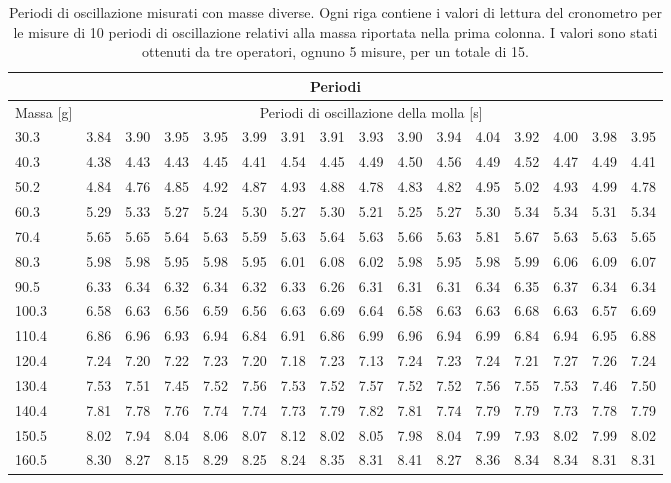 \begin{table}
    \centering
    \scriptsize
    \begin{tabular}{l | c c c c c c c c c c c c c c c}
        \multicolumn{16}{c}{\small \textbf{Periodi}} \\[1mm]
        \toprule
        {\footnotesize Massa [g]} & \multicolumn{15}{c}{\footnotesize Periodi di oscillazione della molla [s]} \\
        \midrule
		30.3 & 3.84 & 3.90 & 3.95 & 3.95 & 3.99 & 3.91 & 3.91 & 3.93 & 3.90 & 3.94 & 4.04 & 3.92 & 4.00 & 3.98 & 3.95 \\
		40.3 & 4.38 & 4.43 & 4.43 & 4.45 & 4.41 & 4.54 & 4.45 & 4.49 & 4.50 & 4.56 & 4.49 & 4.52 & 4.47 & 4.49 & 4.41 \\
		50.2 & 4.84 & 4.76 & 4.85 & 4.92 & 4.87 & 4.93 & 4.88 & 4.78 & 4.83 & 4.82 & 4.95 & 5.02 & 4.93 & 4.99 & 4.78 \\
		60.3 & 5.29 & 5.33 & 5.27 & 5.24 & 5.30 & 5.27 & 5.30 & 5.21 & 5.25 & 5.27 & 5.30 & 5.34 & 5.34 & 5.31 & 5.34 \\
		70.4 & 5.65 & 5.65 & 5.64 & 5.63 & 5.59 & 5.63 & 5.64 & 5.63 & 5.66 & 5.63 & 5.81 & 5.67 & 5.63 & 5.63 & 5.65 \\
		80.3 & 5.98 & 5.98 & 5.95 & 5.98 & 5.95 & 6.01 & 6.08 & 6.02 & 5.98 & 5.95 & 5.98 & 5.99 & 6.06 & 6.09 & 6.07 \\
		90.5 & 6.33 & 6.34 & 6.32 & 6.34 & 6.32 & 6.33 & 6.26 & 6.31 & 6.31 & 6.31 & 6.34 & 6.35 & 6.37 & 6.34 & 6.34 \\
		100.3 & 6.58 & 6.63 & 6.56 & 6.59 & 6.56 & 6.63 & 6.69 & 6.64 & 6.58 & 6.63 & 6.63 & 6.68 & 6.63 & 6.57 & 6.69 \\
		110.4 & 6.86 & 6.96 & 6.93 & 6.94 & 6.84 & 6.91 & 6.86 & 6.99 & 6.96 & 6.94 & 6.99 & 6.84 & 6.94 & 6.95 & 6.88 \\
		120.4 & 7.24 & 7.20 & 7.22 & 7.23 & 7.20 & 7.18 & 7.23 & 7.13 & 7.24 & 7.23 & 7.24 & 7.21 & 7.27 & 7.26 & 7.24 \\
		130.4 & 7.53 & 7.51 & 7.45 & 7.52 & 7.56 & 7.53 & 7.52 & 7.57 & 7.52 & 7.52 & 7.56 & 7.55 & 7.53 & 7.46 & 7.50 \\
		140.4 & 7.81 & 7.78 & 7.76 & 7.74 & 7.74 & 7.73 & 7.79 & 7.82 & 7.81 & 7.74 & 7.79 & 7.79 & 7.73 & 7.78 & 7.79 \\
		150.5 & 8.02 & 7.94 & 8.04 & 8.06 & 8.07 & 8.12 & 8.02 & 8.05 & 7.98 & 8.04 & 7.99 & 7.93 & 8.02 & 7.99 & 8.02 \\
		160.5 & 8.30 & 8.27 & 8.15 & 8.29 & 8.25 & 8.24 & 8.35 & 8.31 & 8.41 & 8.27 & 8.36 & 8.34 & 8.34 & 8.31 & 8.31 \\
        \bottomrule
    \end{tabular}
    \caption{Periodi di oscillazione misurati con masse diverse. Ogni riga contiene i valori di lettura del cronometro per le misure di 10 periodi di oscillazione relativi alla massa riportata nella prima colonna. I valori sono stati ottenuti da tre operatori, ognuno 5 misure, per un totale di 15.}
    \label{tab:periodi}
\end{table}

